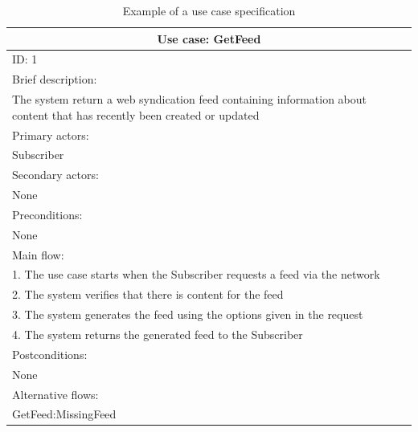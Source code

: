 \documentclass{article}
\begin{document}
\begin{table}[]
\begin{center}
\begin{tabular}{ | p{\textwidth} |}
\hline
\multicolumn{1}{|c|}{Use case: GetFeed} \\
\hline
ID: 1 \\
\hline
Brief description: \\
The system return a web syndication feed containing information about content that has recently been created or updated \\
\hline
Primary actors: \\
Subscriber \\
\hline
Secondary actors: \\
None \\
\hline
Preconditions: \\
None \\
\hline
Main flow: \\
1. The use case starts when the Subscriber requests a feed via the network \\
2. The system verifies that there is content for the feed \\
3. The system generates the feed using the options given in the request \\
4. The system returns the generated feed to the Subscriber \\
\hline
Postconditions: \\
None \\
\hline
Alternative flows: \\
GetFeed:MissingFeed \\
\hline
\end{tabular}
\end{center}
\caption{Example of a use case specification}
\label{use-case-detail}
\end{table}
\end{document}
